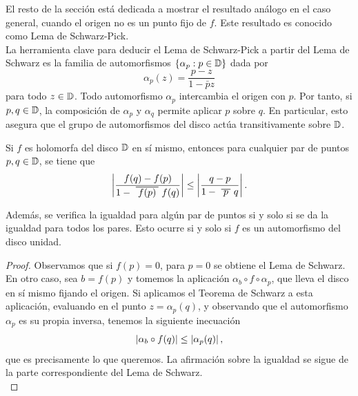 El resto de la sección está dedicada a mostrar el resultado análogo en el caso general, cuando el origen no es un punto fijo de $f$. Este resultado es conocido como Lema de Schwarz-Pick. \\ %

La herramienta clave para deducir el Lema de Schwarz-Pick a partir del Lema de Schwarz es la familia de automorfismos $\{\alpha_p: p\in \mathbb{D}\}$ dada por
\begin{equation*}
    \alpha_p (z) = \frac{p-z}{1 - \bar{p}z}
\end{equation*}
para todo $z \in \mathbb{D}$. Todo automorfismo $\alpha_p$ intercambia el origen con $p$. Por tanto, si $p, q \in \mathbb{D}$, la composición de $\alpha_p$ y $\alpha_q$ permite aplicar $p$ sobre $q$. En particular, esto asegura que el grupo de automorfismos del disco actúa transitivamente sobre $\mathbb{D}$. \\

\begin{theorem}
    Si $f$ es holomorfa del disco $\mathbb{D}$ en sí mismo, entonces para cualquier par de puntos $p, q \in \mathbb{D}$, se tiene que
    \begin{equation*}
        \abs{\frac{f(q) - f(p)}{1 - \xbar{f(p)}f(q)}} \leq \abs{\frac{q-p}{1 - \xbar{p}q}}.
    \end{equation*}

    Además, se verifica la igualdad para algún par de puntos si y solo si se da la igualdad para todos los pares. Esto ocurre si y solo si $f$ es un automorfismo del disco unidad.
\end{theorem}

\begin{proof}
    Observamos que si $f(p) = 0$, para $p = 0$ se obtiene el Lema de Schwarz. En otro caso, sea $b = f(p)$ y tomemos la aplicación $\alpha_b \circ f \circ \alpha_p$, que lleva el disco en sí mismo fijando el origen. Si aplicamos el Teorema de Schwarz a esta aplicación, evaluando en el punto $z = \alpha_p(q)$, y observando que el automorfismo $\alpha_p$ es su propia inversa, tenemos la siguiente inecuación
    \begin{equation*}
        \left\lvert\alpha_b \circ f(q)\right\rvert \leq \left\lvert\alpha_p(q)\right\rvert,
    \end{equation*}
    que es precisamente lo que queremos. La afirmación sobre la igualdad se sigue de la parte correspondiente del Lema de Schwarz. \\
\end{proof}

